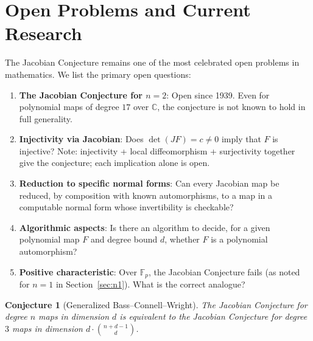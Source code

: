 \documentclass[12pt,a4paper]{amsart}
\newtheorem{conjecture}[theorem]{Conjecture}
\theoremstyle{definition}
\theoremstyle{remark}
\begin{document}
\section{Open Problems and Current Research}
\label{sec:open}

The Jacobian Conjecture remains one of the most celebrated open problems in
mathematics. We list the primary open questions:

\begin{enumerate}[label=(\arabic*)]
  \item \textbf{The Jacobian Conjecture for $n = 2$}: Open since 1939. Even for
        polynomial maps of degree $17$ over $\mathbb{C}$, the conjecture is not known
        to hold in full generality.

  \item \textbf{Injectivity via Jacobian}: Does $\det(JF) = c \neq 0$ imply that
        $F$ is injective? Note: injectivity + local diffeomorphism + surjectivity
        together give the conjecture; each implication alone is open.

  \item \textbf{Reduction to specific normal forms}: Can every Jacobian map be
        reduced, by composition with known automorphisms, to a map in a computable
        normal form whose invertibility is checkable?

  \item \textbf{Algorithmic aspects}: Is there an algorithm to decide, for a given
        polynomial map $F$ and degree bound $d$, whether $F$ is a polynomial
        automorphism?

  \item \textbf{Positive characteristic}: Over $\mathbb{F}_p$, the Jacobian
        Conjecture fails (as noted for $n = 1$ in Section~\ref{sec:n1}). What is
        the correct analogue?
\end{enumerate}

\begin{conjecture}[Generalized Bass--Connell--Wright]\label{conj:genBCW}
The Jacobian Conjecture for degree $n$ maps in dimension $d$ is equivalent to
the Jacobian Conjecture for degree $3$ maps in dimension $d \cdot \binom{n+d-1}{d}$.
\end{conjecture}

\end{document}
